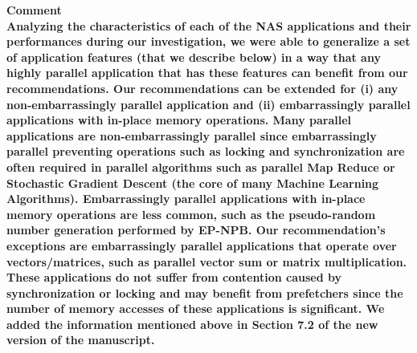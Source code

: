 \documentclass{article}
\newcounter{answer}
\newenvironment{answer}
{ \refstepcounter{answer}\vspace{0.5cm}\bfseries\noindent Comment~\theanswer\\ }
{ \vspace{0.5cm} }
\begin{document}
\begin{answer}

Analyzing the characteristics of each of the NAS applications and their performances during our investigation, we were able to generalize a set of application features (that we describe below) in a way that any highly parallel application that has these features can benefit from our recommendations.  Our recommendations can be extended for (i) any non-embarrassingly parallel application and (ii) embarrassingly parallel applications with in-place memory operations. Many parallel applications are non-embarrassingly parallel since embarrassingly parallel preventing operations such as locking and synchronization are often required in parallel algorithms such as parallel Map Reduce or Stochastic Gradient Descent (the core of many Machine Learning Algorithms). Embarrassingly parallel applications with in-place memory operations are less common, such as the pseudo-random number generation performed by EP-NPB. Our recommendation's exceptions are embarrassingly parallel applications that operate over vectors/matrices, such as parallel vector sum or matrix multiplication. These applications do not suffer from contention caused by synchronization or locking and may benefit from prefetchers since the number of memory accesses of these applications is significant. We added the information mentioned above in Section 7.2 of the new version of the manuscript.
\end{answer}
\end{document}

